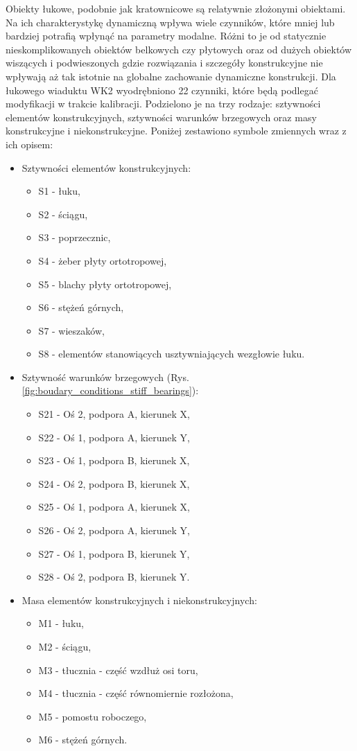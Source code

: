 Obiekty łukowe, podobnie jak kratownicowe są relatywnie złożonymi obiektami. Na ich charakterystykę dynamiczną wpływa wiele czynników, które mniej lub bardziej potrafią wpłynąć na parametry modalne. Różni to je od statycznie nieskomplikowanych obiektów belkowych czy płytowych oraz od dużych obiektów wiszących i podwieszonych gdzie rozwiązania i szczegóły konstrukcyjne nie wpływają aż tak istotnie na globalne zachowanie dynamiczne konstrukcji. Dla łukowego wiaduktu WK2 wyodrębniono 22 czynniki, które będą podlegać modyfikacji w trakcie kalibracji. Podzielono je na trzy rodzaje: sztywności elementów konstrukcyjnych, sztywności warunków brzegowych oraz masy konstrukcyjne i niekonstrukcyjne. Poniżej zestawiono symbole zmiennych wraz z ich opisem:
\begin{itemize}
	\item Sztywności elementów konstrukcyjnych:
	\begin{itemize}
		\item S1 - łuku,
		\item S2 - ściągu,
		\item S3 - poprzecznic,
		\item S4 - żeber płyty ortotropowej,
		\item S5 - blachy płyty ortotropowej,
		\item S6 - stężeń górnych,
		\item S7 - wieszaków,
		\item S8 - elementów stanowiących usztywniających wezgłowie łuku.
	\end{itemize}
	\item Sztywność warunków brzegowych (Rys. \ref{fig:boudary_conditions_stiff_bearings}):
	\begin{itemize}
		\item S21 - Oś 2, podpora A, kierunek X,
		\item S22 - Oś 1, podpora A, kierunek Y,
		\item S23 - Oś 1, podpora B, kierunek X,
		\item S24 - Oś 2, podpora B, kierunek X,
		\item S25 - Oś 1, podpora A, kierunek X,
		\item S26 - Oś 2, podpora A, kierunek Y,
		\item S27 - Oś 1, podpora B, kierunek Y,
		\item S28 - Oś 2, podpora B, kierunek Y.
	\end{itemize}
	\item Masa elementów konstrukcyjnych i niekonstrukcyjnych:
	\begin{itemize}
		\item M1 - łuku,
		\item M2 - ściągu,
		\item M3 - tłucznia - część wzdłuż osi toru,
		\item M4 - tłucznia - część równomiernie rozłożona,
		\item M5 - pomostu roboczego,
		\item M6 - stężeń górnych.
	\end{itemize}
\end{itemize}

